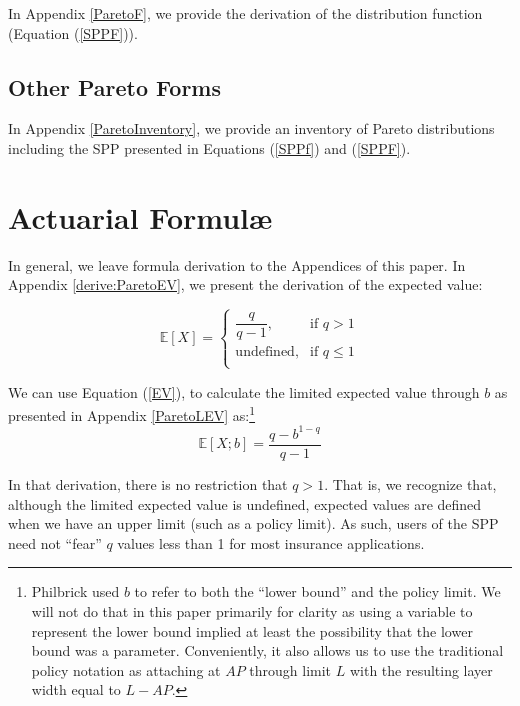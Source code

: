 \documentclass[]{article} %
\begin{document}
In  Appendix \ref{ParetoF}, we provide the derivation of the distribution function (Equation (\ref{SPPF})).

\subsection{Other Pareto Forms}
In Appendix \ref{ParetoInventory}, we provide an inventory of Pareto distributions including the SPP presented in Equations (\ref{SPPf}) and (\ref{SPPF}). 

\section{Actuarial Formul\ae}
In general, we leave formula derivation to the Appendices of this paper. In Appendix \ref{derive:ParetoEV}, we present the derivation of the expected value:

\begin{equation}
\mathbb{E}[X]  = 
\begin{cases}
\dfrac{q}{q-1},& \text{if } q > 1\\
\text{undefined},& \text{if } q \leq 1\\         
\end{cases}
\end{equation}


We can use Equation (\ref{EV}), to calculate the limited expected value through $b$ as presented in Appendix \ref{ParetoLEV} as:\footnote{Philbrick used $b$ to refer to both the ``lower bound'' and the policy limit. We will not do that in this paper primarily for clarity as using a variable to represent the lower bound implied at least the possibility that the lower bound was a parameter. Conveniently, it also allows us  to use the traditional policy notation as attaching at $AP$ through limit $L$ with the resulting layer width equal to $L - AP$.} 
\begin{equation}
	\mathbb{E}[X;b] = \frac{q - b^{1-q}}{q-1}\label{eqntx:ParetoLEV}
\end{equation}

In that derivation, there is no restriction that $q > 1$. That is, we recognize that, although the limited expected value is undefined, expected values are defined when we have an upper limit (such as a policy limit). As such, users of the SPP need not ``fear'' $q$ values less than 1 for most insurance applications.
\end{document}
